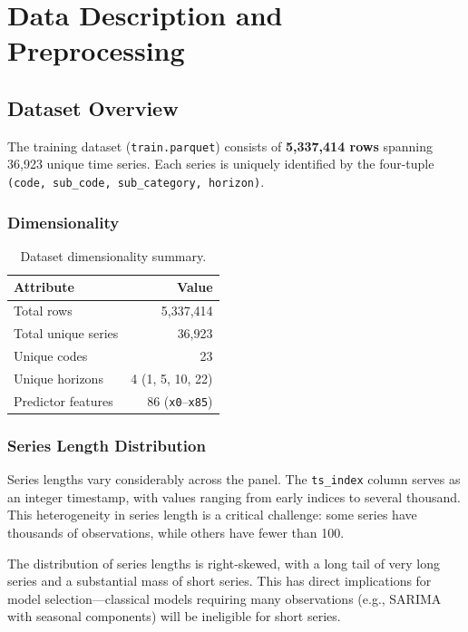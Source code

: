 \chapter{Data Description and Preprocessing}
\label{ch:data}

\section{Dataset Overview}

The training dataset (\texttt{train.parquet}) consists of \textbf{5,337,414 rows} spanning 36,923 unique time series. Each series is uniquely identified by the four-tuple \texttt{(code, sub\_code, sub\_category, horizon)}.

\subsection{Dimensionality}

\begin{table}[H]
\centering
\caption{Dataset dimensionality summary.}
\begin{tabular}{lr}
\toprule
\textbf{Attribute} & \textbf{Value} \\
\midrule
Total rows & 5,337,414 \\
Total unique series & 36,923 \\
Unique codes & 23 \\
Unique horizons & 4 (1, 5, 10, 22) \\
Predictor features & 86 (\texttt{x0}--\texttt{x85}) \\
\bottomrule
\end{tabular}
\end{table}

\subsection{Series Length Distribution}

Series lengths vary considerably across the panel. The \texttt{ts\_index} column serves as an integer timestamp, with values ranging from early indices to several thousand. This heterogeneity in series length is a critical challenge: some series have thousands of observations, while others have fewer than 100.

The distribution of series lengths is right-skewed, with a long tail of very long series and a substantial mass of short series. This has direct implications for model selection---classical models requiring many observations (e.g., SARIMA with seasonal components) will be ineligible for short series.

